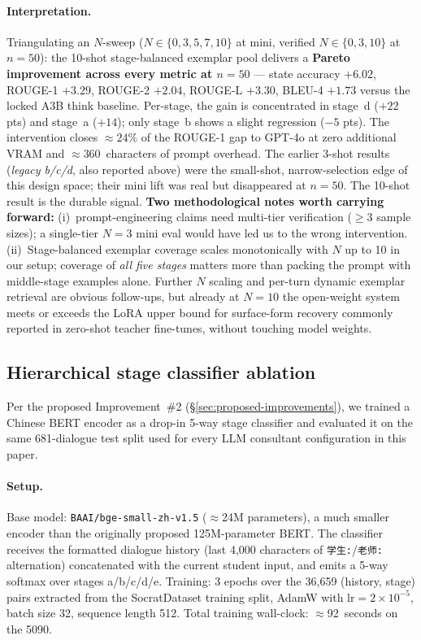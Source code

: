 \documentclass[11pt]{article}
\begin{document}
\paragraph{Interpretation.} Triangulating an $N$-sweep ($N \in \{0, 3, 5, 7, 10\}$ at mini, verified $N \in \{0, 3, 10\}$ at $n{=}50$): the 10-shot stage-balanced exemplar pool delivers a \textbf{Pareto improvement across every metric at $n{=}50$} --- state accuracy $+6.02$, ROUGE-1 $+3.29$, ROUGE-2 $+2.04$, ROUGE-L $+3.30$, BLEU-4 $+1.73$ versus the locked A3B think baseline. Per-stage, the gain is concentrated in stage~d ($+22$ pts) and stage~a ($+14$); only stage~b shows a slight regression ($-5$ pts). The intervention closes $\approx 24\%$ of the ROUGE-1 gap to GPT-4o at zero additional VRAM and $\approx 360$~characters of prompt overhead.
The earlier 3-shot results (\emph{legacy b/c/d}, also reported above) were the small-shot, narrow-selection edge of this design space; their mini lift was real but disappeared at $n{=}50$. The 10-shot result is the durable signal. \textbf{Two methodological notes worth carrying forward:} (i)~prompt-engineering claims need multi-tier verification ($\geq 3$ sample sizes); a single-tier $N{=}3$ mini eval would have led us to the wrong intervention. (ii)~Stage-balanced exemplar coverage scales monotonically with $N$ up to 10 in our setup; coverage of \emph{all five stages} matters more than packing the prompt with middle-stage examples alone. Further $N$ scaling and per-turn dynamic exemplar retrieval are obvious follow-ups, but already at $N{=}10$ the open-weight system meets or exceeds the LoRA upper bound for surface-form recovery commonly reported in zero-shot teacher fine-tunes, without touching model weights.

\subsection{Hierarchical stage classifier ablation}
\label{sec:bertclassifier}

Per the proposed Improvement~\#2 (\S\ref{sec:proposed-improvements}), we trained a Chinese BERT encoder as a drop-in 5-way stage classifier and evaluated it on the same 681-dialogue test split used for every LLM consultant configuration in this paper.

\paragraph{Setup.} Base model: \texttt{BAAI/bge-small-zh-v1.5} ($\approx$24M parameters), a much smaller encoder than the originally proposed 125M-parameter BERT. The classifier receives the formatted dialogue history (last 4{,}000 characters of \texttt{学生:}/\texttt{老师:} alternation) concatenated with the current student input, and emits a 5-way softmax over stages a/b/c/d/e. Training: 3 epochs over the 36{,}659 (history, stage) pairs extracted from the SocratDataset training split, AdamW with $\text{lr}{=}2{\times}10^{-5}$, batch size 32, sequence length 512. Total training wall-clock: $\approx$92~seconds on the 5090.
\end{document}
